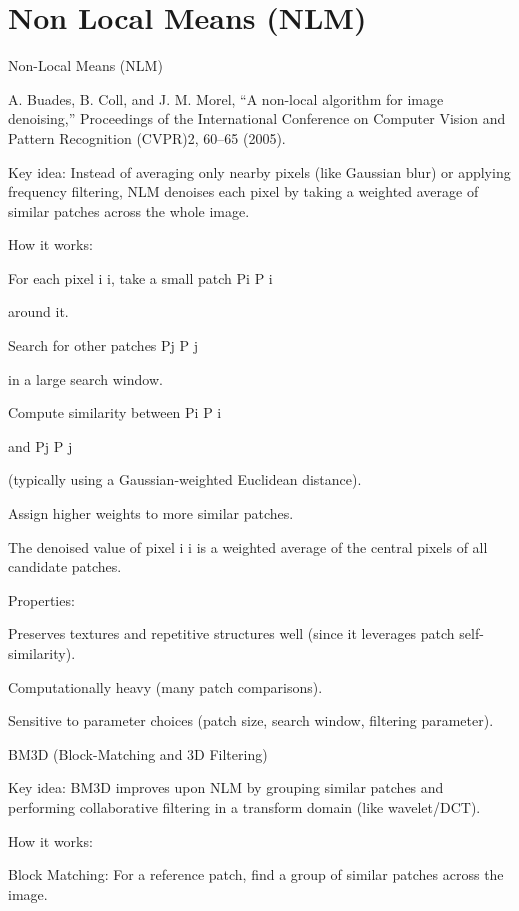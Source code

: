 \chapter{Non Local Means (NLM)}



Non-Local Means (NLM)

A. Buades, B. Coll, and J. M. Morel, “A non-local algorithm for image denoising,” Proceedings of the International Conference on Computer Vision and Pattern Recognition (CVPR)2, 60–65 (2005).

Key idea:
Instead of averaging only nearby pixels (like Gaussian blur) or applying frequency filtering, NLM denoises each pixel by taking a weighted average of similar patches across the whole image.

How it works:

For each pixel 
i
i, take a small patch 
Pi
P
i
	​

 around it.

Search for other patches 
Pj
P
j
	​

 in a large search window.

Compute similarity between 
Pi
P
i
	​

 and 
Pj
P
j
	​

 (typically using a Gaussian-weighted Euclidean distance).

Assign higher weights to more similar patches.

The denoised value of pixel 
i
i is a weighted average of the central pixels of all candidate patches.

Properties:

Preserves textures and repetitive structures well (since it leverages patch self-similarity).

Computationally heavy (many patch comparisons).

Sensitive to parameter choices (patch size, search window, filtering parameter).

BM3D (Block-Matching and 3D Filtering)

Key idea:
BM3D improves upon NLM by grouping similar patches and performing collaborative filtering in a transform domain (like wavelet/DCT).

How it works:

Block Matching: For a reference patch, find a group of similar patches across the image.

